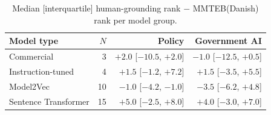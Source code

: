 \begin{table}[t]
\centering
\small
\caption{Median [interquartile] human-grounding rank $-$ MMTEB(Danish) rank per model group.}
\label{tab:model-type-rank-delta}
\begin{tabular}{lrrr}
\toprule
\textbf{Model type} & \textbf{$N$} & \textbf{Policy} & \textbf{Government AI} \\
\midrule
Commercial & 3 & $+2.0$ {\scriptsize [$-10.5$, $+2.0$]} & $-1.0$ {\scriptsize [$-12.5$, $+0.5$]} \\
Instruction-tuned & 4 & $+1.5$ {\scriptsize [$-1.2$, $+7.2$]} & $+1.5$ {\scriptsize [$-3.5$, $+5.5$]} \\
Model2Vec & 10 & $-1.0$ {\scriptsize [$-4.2$, $-1.0$]} & $-3.5$ {\scriptsize [$-6.2$, $+4.8$]} \\
Sentence Transformer & 15 & $+5.0$ {\scriptsize [$-2.5$, $+8.0$]} & $+4.0$ {\scriptsize [$-3.0$, $+7.0$]} \\
\bottomrule
\end{tabular}
\end{table}
